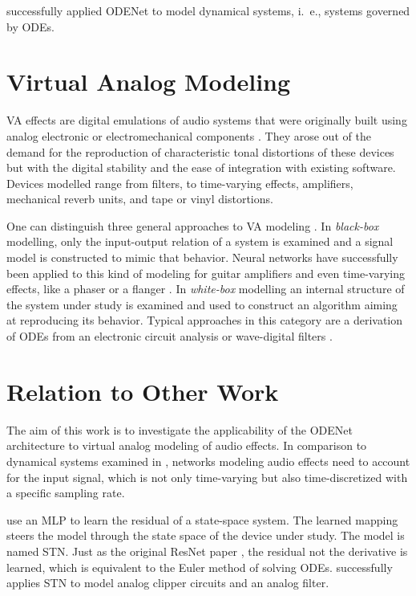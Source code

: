 \cite{Karlsson2019} successfully applied ODENet to model dynamical systems, i.\ e., systems governed by \acp{ODE}. 

\section{Virtual Analog Modeling}
\label{sec:virtual_analog_modeling}
\Ac{VA} effects are digital emulations of audio systems that were originally built using analog electronic or electromechanical components \cite{Zoelzer2011}. They arose out of the demand for the reproduction of characteristic tonal distortions of these devices but with the digital stability and the ease of integration with existing software. Devices modelled range from filters, to time-varying effects, amplifiers, mechanical reverb units, and tape or vinyl distortions.

One can distinguish three general approaches to \ac{VA} modeling \cite{Kiiski2016,Wright2020}. In \emph{black-box} modelling, only the input-output relation of a system is examined and a signal model is constructed to mimic that behavior. Neural networks have successfully been applied to this kind of modeling for guitar amplifiers \cite{Wright2019,Wrightetal2020} and even time-varying effects, like a phaser or a flanger \cite{Wright2020}. In \emph{white-box} modelling an internal structure of the system under study is examined and used to construct an algorithm aiming at reproducing its behavior. Typical approaches in this category are a derivation of \acp{ODE} from an electronic circuit analysis \cite{Yeh2007} or wave-digital filters \cite{PASPWEB2010}.


\section{Relation to Other Work}
\label{sec:relation_to_other_work}
The aim of this work is to investigate the applicability of the ODENet architecture to virtual analog modeling of audio effects. In comparison to dynamical systems examined in \cite{Karlsson2019}, networks modeling audio effects need to account for the input signal, which is not only time-varying but also time-discretized with a specific sampling rate. 

\cite{Parker2019} use an \ac{MLP} to learn the residual of a state-space system. The learned mapping steers the model through the state space of the device under study. The model is named \ac{STN}. Just as the original \ac{ResNet} paper \cite{He2015}, the residual not the derivative is learned, which is equivalent to the Euler method of solving \acp{ODE}. \cite{Parker2019} successfully applies \ac{STN} to model analog clipper circuits and an analog filter.
